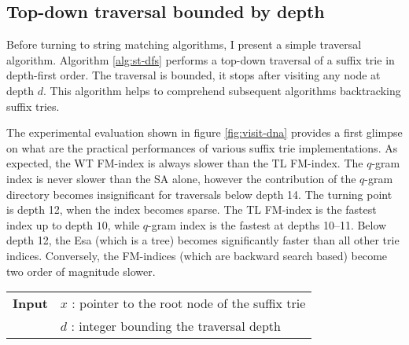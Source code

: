 \subsection{Top-down traversal bounded by depth}
\label{sec:index:algo:traversal}

Before turning to string matching algorithms, I present a simple traversal algorithm.
Algorithm \ref{alg:st-dfs} performs a top-down traversal of a suffix trie in depth-first order.
The traversal is bounded, \ie it stops after visiting any node at depth $d$.
This algorithm helps to comprehend subsequent algorithms backtracking suffix tries.

The experimental evaluation shown in figure \ref{fig:visit-dna} provides a first glimpse on what are the practical performances of various suffix trie implementations.
As expected, the WT FM-index is always slower than the TL FM-index.
The $q$-gram index is never slower than the SA alone, however the contribution of the $q$-gram directory becomes insignificant for traversals below depth 14.
The turning point is depth 12, when the index becomes sparse.
The TL FM-index is the fastest index up to depth $10$, while $q$-gram index is the fastest at depths 10--11.
Below depth 12, the Esa (which is a tree) becomes significantly faster than all other trie indices.
Conversely, the FM-indices (which are backward search based) become two order of magnitude slower.

\begin{figure*}[h]
\begin{center}
\begin{minipage}[t]{.7\textwidth}
\begin{algorithm}[H]
\begin{tabular}{ll}
\textbf{Input}  & $x$ : pointer to the root node of the suffix trie\\
 			    & $d$ : integer bounding the traversal depth\\
\end{tabular}
\begin{algorithmic}[1]
		\Repeat
			\State {}
		\Until {}
	\EndIf
\EndIf
\end{algorithmic}
\label{alg:st-dfs}
\end{algorithm}
\end{minipage}
\end{center}
\end{figure*}

